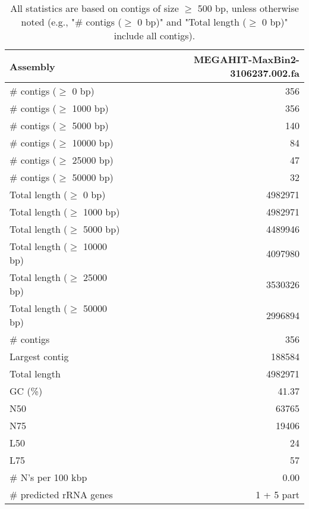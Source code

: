 \documentclass[12pt,a4paper]{article}
\begin{document}
\begin{table}[ht]
\begin{center}
\caption{All statistics are based on contigs of size $\geq$ 500 bp, unless otherwise noted (e.g., "\# contigs ($\geq$ 0 bp)" and "Total length ($\geq$ 0 bp)" include all contigs).}
\begin{tabular}{|l*{1}{|r}|}
\hline
Assembly & MEGAHIT-MaxBin2-3106237.002.fa \\ \hline
\# contigs ($\geq$ 0 bp) & 356 \\ \hline
\# contigs ($\geq$ 1000 bp) & 356 \\ \hline
\# contigs ($\geq$ 5000 bp) & 140 \\ \hline
\# contigs ($\geq$ 10000 bp) & 84 \\ \hline
\# contigs ($\geq$ 25000 bp) & 47 \\ \hline
\# contigs ($\geq$ 50000 bp) & 32 \\ \hline
Total length ($\geq$ 0 bp) & 4982971 \\ \hline
Total length ($\geq$ 1000 bp) & 4982971 \\ \hline
Total length ($\geq$ 5000 bp) & 4489946 \\ \hline
Total length ($\geq$ 10000 bp) & 4097980 \\ \hline
Total length ($\geq$ 25000 bp) & 3530326 \\ \hline
Total length ($\geq$ 50000 bp) & 2996894 \\ \hline
\# contigs & 356 \\ \hline
Largest contig & 188584 \\ \hline
Total length & 4982971 \\ \hline
GC (\%) & 41.37 \\ \hline
N50 & 63765 \\ \hline
N75 & 19406 \\ \hline
L50 & 24 \\ \hline
L75 & 57 \\ \hline
\# N's per 100 kbp & 0.00 \\ \hline
\# predicted rRNA genes & 1 + 5 part \\ \hline
\end{tabular}
\end{center}
\end{table}
\end{document}
